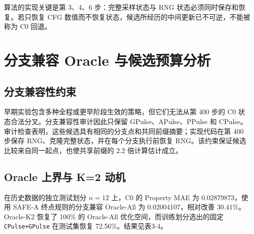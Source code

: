 算法的实现关键是第 3、4、6 步：完整采样状态与 RNG 状态必须同时保存和恢复。若只恢复 CFG 数值而不恢复状态，候选所经历的中间更新已不可逆，不能被称为 C0 回退。

\section{分支兼容 Oracle 与候选预算分析}

\subsection{分支兼容性约束}

早期实验包含多种全程或更早阶段生效的策略，但它们无法从第 400 步的 C0 状态合法分叉。分支兼容性审计因此只保留 GPulse、APulse、PPulse 和 CPulse。审计检查表明，这些候选具有相同的分支点和共同前缀摘要；实现代码在第 400 步保存 RNG、克隆完整状态，并在每个分支执行前恢复 RNG。该约束保证候选比较来自同一起点，也使共享前缀的 2.2 倍计算估计成立。

\subsection{Oracle 上界与 K=2 动机}

在历史数据的独立测试划分 \(n=12\) 上，C0 的 Property MAE 为 0.02879873，使用 SAFE-A 终点规则的分支兼容 Oracle-All 为 0.02004107，相对改善 30.41\%。Oracle-K2 恢复了 100\% 的 Oracle-All 优化空间，而训练划分选出的固定 \texttt{CPulse+GPulse} 在测试集恢复 72.56\%。结果见表3-4。


